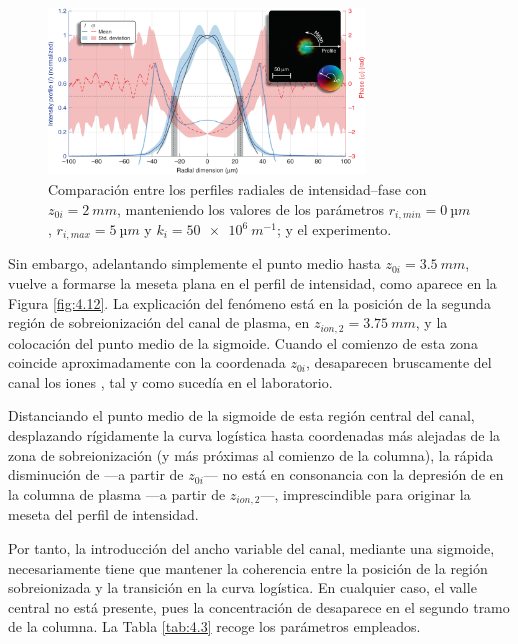 \begin{figure}
  \centering
  \includegraphics[width=0.75\textwidth]{Figuras/ch4_cmp11.png}
  \caption{Comparación entre los perfiles radiales de intensidad--fase con $z_{0i}=\qty{2}{mm}$, manteniendo los valores de los parámetros $r_{i,min}=\qty{0}{µm}$, $r_{i,max}=\qty{5}{µm}$ y $k_{i}=\qty{50e6}{m^{-1}}$; y el experimento.}
  \label{fig:4.11}
\end{figure}

Sin embargo, adelantando simplemente el punto medio hasta $z_{0i}=\qty{3.5}{mm}$, vuelve a formarse la meseta plana en el perfil de intensidad, como aparece en la Figura \ref{fig:4.12}. La explicación del fenómeno está en la posición de la segunda región de sobreionización del canal de plasma, en $z_{ion,2}=\qty{3.75}{mm}$, y la colocación del punto medio de la sigmoide. Cuando el comienzo de esta zona coincide aproximadamente con la coordenada $z_{0i}$, desaparecen bruscamente del canal los iones , tal y como sucedía en el laboratorio. 

Distanciando el punto medio de la sigmoide de esta región central del canal, desplazando rígidamente la curva logística hasta coordenadas más alejadas de la zona de sobreionización (y más próximas al comienzo de la columna), la rápida disminución de  ---a partir de $z_{0i}$--- no está en consonancia con la depresión de  en la columna de plasma ---a partir de $z_{ion,2}$---, imprescindible para originar la meseta del perfil de intensidad.

Por tanto, la introducción del ancho variable del canal, mediante una sigmoide, necesariamente tiene que mantener la coherencia entre la posición de la región sobreionizada y la transición en la curva logística. En cualquier caso, el valle central no está presente, pues la concentración de  desaparece en el segundo tramo de la columna. La Tabla \ref{tab:4.3} recoge los parámetros empleados. 

